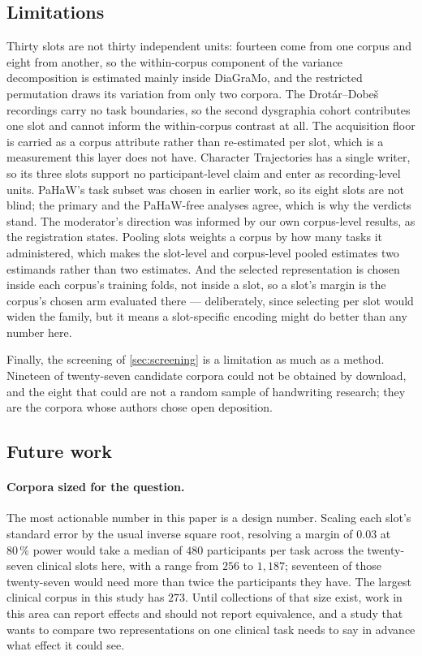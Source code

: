 \subsection{Limitations}
\label{sec:limitations}

Thirty slots are not thirty independent units: fourteen come from one corpus and eight from
another, so the within-corpus component of the variance decomposition is estimated mainly inside
DiaGraMo, and the restricted permutation draws its variation from only two corpora. The
Drot\'ar--Dobe\v{s} recordings carry no task boundaries, so the second dysgraphia cohort contributes
one slot and cannot inform the within-corpus contrast at all. The acquisition floor is carried as a
corpus attribute rather than re-estimated per slot, which is a measurement this layer does not have.
Character Trajectories has a single writer, so its three slots support no participant-level claim
and enter as recording-level units. PaHaW's task subset was chosen in earlier work, so its eight
slots are not blind; the primary and the PaHaW-free analyses agree, which is why the verdicts stand.
The moderator's direction was informed by our own corpus-level results, as the registration states.
Pooling slots weights a corpus by how many tasks it administered, which makes the slot-level and
corpus-level pooled estimates two estimands rather than two estimates. And the selected
representation is chosen inside each corpus's training folds, not inside a slot, so a slot's margin
is the corpus's chosen arm evaluated there --- deliberately, since selecting per slot would widen
the family, but it means a slot-specific encoding might do better than any number here.

Finally, the screening of \cref{sec:screening} is a limitation as much as a method. Nineteen of
twenty-seven candidate corpora could not be obtained by download, and the eight that could are not a
random sample of handwriting research; they are the corpora whose authors chose open deposition.

\subsection{Future work}
\label{sec:future}

\paragraph{Corpora sized for the question.} The most actionable number in this paper is a design
number. Scaling each slot's standard error by the usual inverse square root, resolving a margin of
$0.03$ at $80\,\%$ power would take a median of $480$ participants per task across the twenty-seven
clinical slots here, with a range from $256$ to $1{,}187$; seventeen of those twenty-seven would
need more than twice the participants they have. The largest clinical corpus in this study has
$273$. Until collections of that size exist, work in this area can report effects and should not
report equivalence, and a study that wants to compare two representations on one clinical task needs
to say in advance what effect it could see.

